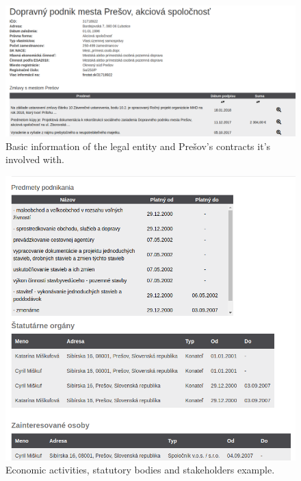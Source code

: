 \documentclass[thesis=B,english]{FITthesis}[2012/06/26]
\begin{document}
{\begin{figure}[H]
  \begin{center}
  \includegraphics[scale=0.30]{pictures/partyDetail1.png}
  \caption{Basic information of the legal entity and Prešov's contracts it's involved with.}
    \label{fig:webapp-partydetail1}
  \end{center}
\end{figure}
\begin{figure}[H]
  \begin{center}
  \includegraphics[scale=0.30]{pictures/partyDetail2.png}
  \caption{Economic activities, statutory bodies and stakeholders example.}
    \label{fig:webapp-partydetail2}
  \end{center}
\end{figure}

}
\end{document}
